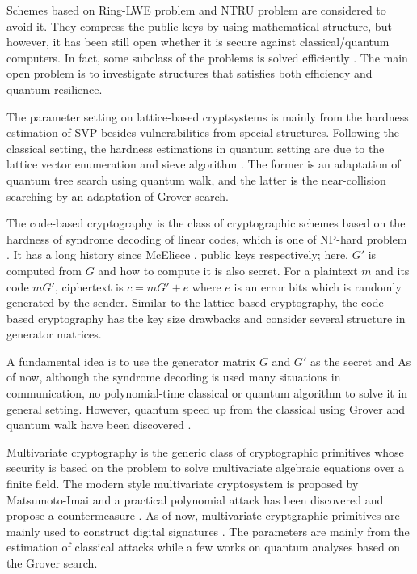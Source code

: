 Schemes based on Ring-LWE problem \cite{LPR13} and NTRU problem \cite{HPS98,SS11} are considered to avoid it.
They compress the public keys by using mathematical structure, but however, 
it has been still open whether it is secure against classical/quantum computers.
In fact, some subclass of the problems is solved efficiently \cite{Duc17}.
The main open problem is to investigate structures that satisfies both efficiency and quantum resilience.

The parameter setting on lattice-based cryptsystems 
is mainly from the hardness estimation of SVP besides vulnerabilities from special structures.
Following the classical setting, the hardness estimations in quantum setting
are due to the lattice vector enumeration \cite{Kannan83,GNR10} and sieve algorithm \cite{AKS01}.
The former \cite{ANS18} is an adaptation of quantum tree search \cite{Mon18} using quantum walk, and the latter \cite{LMP15,KMP+19} is 
the near-collision searching by an adaptation of Grover search.

The code-based cryptography is the class of cryptographic schemes 
based on the hardness of syndrome decoding of linear codes, which is one of NP-hard problem \cite{BMvT78,Has01}.
It has a long history since McEliece \cite{McE78}.
public keys respectively;
here, $G'$ is computed from $G$ and how to compute it is also secret.
For a plaintext $m$ and its code $mG'$, ciphertext is $c=mG'+e$ where $e$ is an error bits which is randomly generated by the sender.
Similar to the lattice-based cryptography, 
the code based cryptography has the key size drawbacks
and consider several structure in generator matrices.

A fundamental idea is to use the generator matrix $G$ and $G'$ as the secret and 
As of now, although the syndrome decoding is used many situations in communication, no polynomial-time classical or quantum algorithm to solve it in general setting.
However, quantum speed up from the classical using Grover and quantum walk have been discovered \cite{KT17}.

Multivariate cryptography is the generic class of cryptographic primitives whose security is based on the problem to solve multivariate algebraic equations over a finite field.
The modern style multivariate cryptosystem is proposed by Matsumoto-Imai \cite{MI88} and a practical polynomial attack \cite{Pat95} has been discovered
and propose a countermeasure \cite{Pat96}.
As of now, multivariate cryptgraphic primitives are mainly used to construct digital signatures \cite{NISTpqround3}.
The parameters are mainly from the estimation of classical attacks \cite{}
while a few works on quantum analyses \cite{FHK+17,BY18} based on the Grover search.

